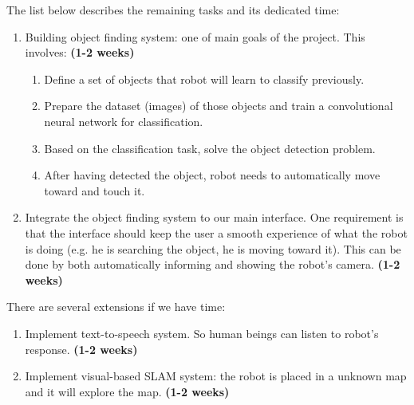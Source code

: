 The list below describes the remaining tasks and its dedicated time:
\begin{enumerate}
	\item Building object finding system: one of main goals of the project. This involves: \textbf{(1-2 weeks)}
	\begin{enumerate}
		\item Define a set of objects that robot will learn to classify previously.
		\item Prepare the dataset (images) of those objects and train a convolutional neural network for classification.
		\item Based on the classification task, solve the object detection problem. 
		\item After having detected the object, robot needs to automatically move toward and touch it.
	\end{enumerate}
	\item Integrate the object finding system to our main interface. One requirement is that the interface should keep the user a smooth experience of what the robot is doing (e.g. he is searching the object, he is moving toward it). This can be done by both automatically informing and showing the robot's camera. \textbf{(1-2 weeks)}
\end{enumerate}

There are several extensions if we have time:
\begin{enumerate}
	\item Implement text-to-speech system. So human beings can listen to robot's response. \textbf{(1-2 weeks)}
	\item Implement visual-based SLAM system: the robot is placed in a unknown map and it will explore the map. \textbf{(1-2 weeks)}
\end{enumerate}
